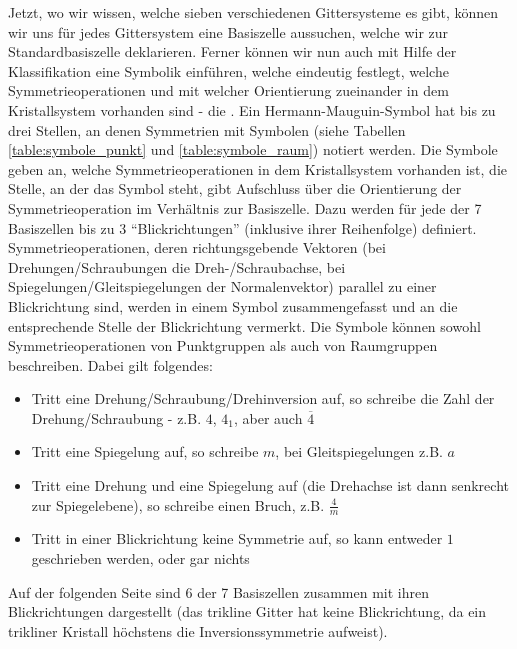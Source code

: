 Jetzt, wo wir wissen, welche sieben verschiedenen Gittersysteme es gibt, können wir uns für jedes Gittersystem eine Basiszelle aussuchen, welche wir zur Standardbasiszelle deklarieren. Ferner können wir nun auch mit Hilfe der Klassifikation eine Symbolik einführen, welche eindeutig festlegt, welche Symmetrieoperationen und mit welcher Orientierung zueinander in dem Kristallsystem vorhanden sind - die . Ein Hermann-Mauguin-Symbol hat bis zu drei Stellen, an denen Symmetrien mit Symbolen (siehe Tabellen \ref{table:symbole_punkt} und \ref{table:symbole_raum}) notiert werden. Die Symbole geben an, welche Symmetrieoperationen in dem Kristallsystem vorhanden ist, die Stelle, an der das Symbol steht, gibt Aufschluss über die Orientierung der Symmetrieoperation im Verhältnis zur Basiszelle. Dazu werden für jede der 7 Basiszellen bis zu 3 \enquote{Blickrichtungen} (inklusive ihrer Reihenfolge) definiert. Symmetrieoperationen, deren richtungsgebende Vektoren (bei Drehungen/Schraubungen die Dreh-/Schraubachse, bei Spiegelungen/Gleitspiegelungen der Normalenvektor) parallel zu einer  Blickrichtung sind, werden in einem Symbol zusammengefasst und an die entsprechende Stelle der Blickrichtung vermerkt. Die Symbole können sowohl Symmetrieoperationen von Punktgruppen als auch von Raumgruppen beschreiben. Dabei gilt folgendes:
\begin{itemize}
	\item Tritt eine Drehung/Schraubung/Drehinversion auf, so schreibe die Zahl der Drehung/Schraubung - z.B. $4$, $4_1$, aber auch $\overline{4}$
	\item Tritt eine Spiegelung auf, so schreibe $m$, bei Gleitspiegelungen z.B. $a$
	\item Tritt eine Drehung und eine Spiegelung auf (die Drehachse ist dann senkrecht zur Spiegelebene), so schreibe einen Bruch, z.B. $\frac{4}{m}$
	\item Tritt in einer Blickrichtung keine Symmetrie auf, so kann entweder $1$ geschrieben werden, oder gar nichts
\end{itemize}
Auf der folgenden Seite sind 6 der 7 Basiszellen zusammen mit ihren Blickrichtungen dargestellt (das trikline Gitter hat keine Blickrichtung, da ein trikliner Kristall höchstens die Inversionssymmetrie aufweist).



